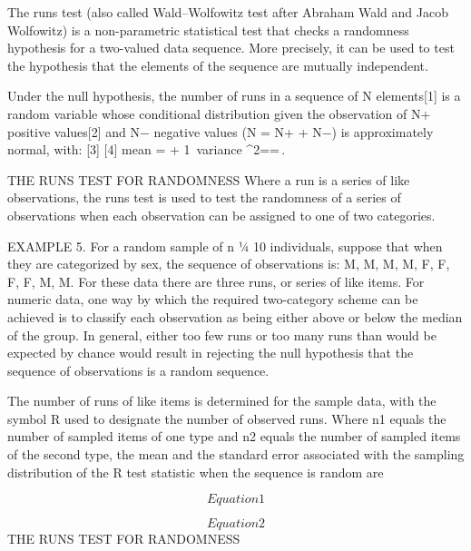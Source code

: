 The runs test (also called Wald–Wolfowitz test after Abraham Wald and Jacob Wolfowitz) is a non-parametric statistical test that checks a randomness hypothesis for a two-valued data sequence. More precisely, it can be used to test the hypothesis that the elements of the sequence are mutually independent.

Under the null hypothesis, the number of runs in a sequence of N elements[1] is a random variable whose conditional distribution given the observation of N+ positive values[2] and N− negative values (N = N+ + N−) is approximately normal, with: [3] [4]
mean \mu= + 1\,
variance \sigma^2==\,.

THE RUNS TEST FOR RANDOMNESS
Where a run is a series of like observations, the runs test is used to test the randomness of a series of
observations when each observation can be assigned to one of two categories.

EXAMPLE 5. For a random sample of n ¼ 10 individuals, suppose that when they are categorized by sex, the sequence of
observations is: M, M, M, M, F, F, F, F, M, M. For these data there are three runs, or series of like items.
For numeric data, one way by which the required two-category scheme can be achieved is to classify each
observation as being either above or below the median of the group. In general, either too few runs or too many
runs than would be expected by chance would result in rejecting the null hypothesis that the sequence of
observations is a random sequence.

The number of runs of like items is determined for the sample data, with the symbol R used to designate the
number of observed runs. Where n1 equals the number of sampled items of one type and n2 equals the number of
sampled items of the second type, the mean and the standard error associated with the sampling distribution of
the R test statistic when the sequence is random are


\[ Equation 1 \]

\[ Equation 2\]
THE RUNS TEST FOR RANDOMNESS

